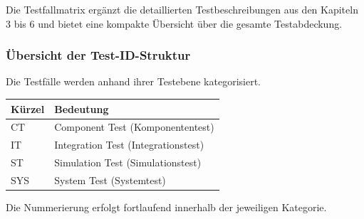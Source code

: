 \documentclass[
  a4paper,
  12pt,
  DIV=12,        %
  parskip=half,  %
  headings=small %
]{scrartcl}
\theoremstyle{definition}
\theoremstyle{definition}
\begin{document}
Die Testfallmatrix ergänzt die detaillierten Testbeschreibungen aus den
Kapiteln 3 bis 6 und bietet eine kompakte Übersicht über die gesamte
Testabdeckung.

\subsubsection{Übersicht der
Test-ID-Struktur}\label{uxfcbersicht-der-test-id-struktur}

Die Testfälle werden anhand ihrer Testebene kategorisiert.

\begin{longtable}[]{@{}ll@{}}
\toprule\noalign{}
Kürzel & Bedeutung \\
\midrule\noalign{}
\endhead
\bottomrule\noalign{}
\endlastfoot
CT & Component Test (Komponententest) \\
IT & Integration Test (Integrationstest) \\
ST & Simulation Test (Simulationstest) \\
SYS & System Test (Systemtest) \\
\end{longtable}

Die Nummerierung erfolgt fortlaufend innerhalb der jeweiligen Kategorie.

\newpage
\end{document}
